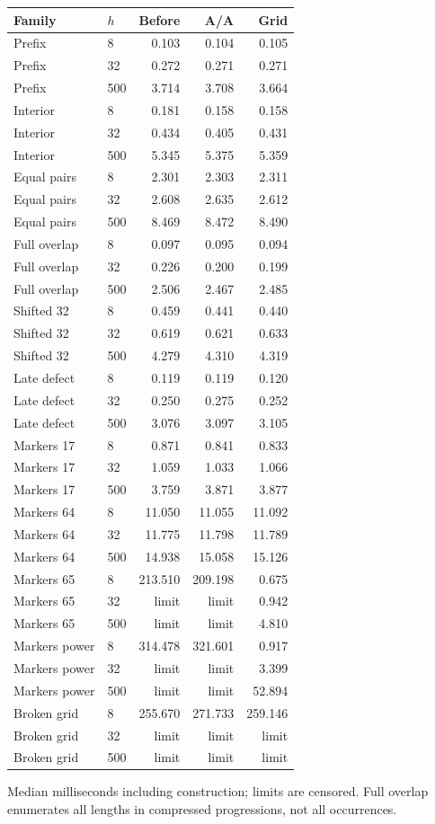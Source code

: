 \begin{center}\small
\begin{tabular}{@{}llrrr@{}}
\toprule
Family & $h$ & Before & A/A & Grid \\
\midrule
Prefix & 8 & 0.103 & 0.104 & 0.105 \\
Prefix & 32 & 0.272 & 0.271 & 0.271 \\
Prefix & 500 & 3.714 & 3.708 & 3.664 \\
Interior & 8 & 0.181 & 0.158 & 0.158 \\
Interior & 32 & 0.434 & 0.405 & 0.431 \\
Interior & 500 & 5.345 & 5.375 & 5.359 \\
Equal pairs & 8 & 2.301 & 2.303 & 2.311 \\
Equal pairs & 32 & 2.608 & 2.635 & 2.612 \\
Equal pairs & 500 & 8.469 & 8.472 & 8.490 \\
Full overlap & 8 & 0.097 & 0.095 & 0.094 \\
Full overlap & 32 & 0.226 & 0.200 & 0.199 \\
Full overlap & 500 & 2.506 & 2.467 & 2.485 \\
Shifted 32 & 8 & 0.459 & 0.441 & 0.440 \\
Shifted 32 & 32 & 0.619 & 0.621 & 0.633 \\
Shifted 32 & 500 & 4.279 & 4.310 & 4.319 \\
Late defect & 8 & 0.119 & 0.119 & 0.120 \\
Late defect & 32 & 0.250 & 0.275 & 0.252 \\
Late defect & 500 & 3.076 & 3.097 & 3.105 \\
Markers 17 & 8 & 0.871 & 0.841 & 0.833 \\
Markers 17 & 32 & 1.059 & 1.033 & 1.066 \\
Markers 17 & 500 & 3.759 & 3.871 & 3.877 \\
Markers 64 & 8 & 11.050 & 11.055 & 11.092 \\
Markers 64 & 32 & 11.775 & 11.798 & 11.789 \\
Markers 64 & 500 & 14.938 & 15.058 & 15.126 \\
Markers 65 & 8 & 213.510 & 209.198 & 0.675 \\
Markers 65 & 32 & limit & limit & 0.942 \\
Markers 65 & 500 & limit & limit & 4.810 \\
Markers power & 8 & 314.478 & 321.601 & 0.917 \\
Markers power & 32 & limit & limit & 3.399 \\
Markers power & 500 & limit & limit & 52.894 \\
Broken grid & 8 & 255.670 & 271.733 & 259.146 \\
Broken grid & 32 & limit & limit & limit \\
Broken grid & 500 & limit & limit & limit \\
\bottomrule
\end{tabular}
\end{center}
Median milliseconds including construction; limits are censored. Full overlap enumerates all lengths in compressed progressions, not all occurrences.
